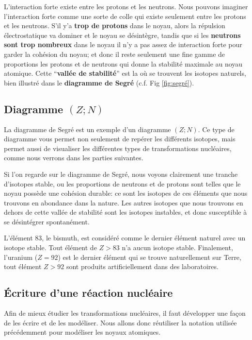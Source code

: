 \documentclass[11pt,a4paper]{article}
\begin{document}
L'interaction forte existe entre les protons et les neutrons. Nous pouvons imaginer l'interaction forte comme une sorte de colle qui existe seulement entre les protons et les neutrons. S'il y'a \textbf{trop de protons} dans le noyau, alors la répulsion électrostatique va dominer et le noyau se désintègre, tandis que si les \textbf{neutrons sont trop nombreux} dans le noyau il n'y a pas assez de interaction forte pour garder la cohésion du noyau; et donc il reste seulement une fine gamme de proportions les protons et de neutrons qui donne la stabilité maximale au noyau atomique. Cette ``\textbf{vallée de stabilité}'' est la où se trouvent les isotopes naturels, bien illustré dans le \textbf{diagramme de Segré} (c.f. Fig \ref{fig:segré}). 

\subsection*{Diagramme $(Z ; N)$}

La diagramme de Segré est un exemple d'un diagramme $(Z;N)$.  Ce type de diagramme vous permet non seulement de repérer les différents isotopes, mais permet aussi de visualiser les différentes types de transformations nucléaires, comme nous verrons dans les parties suivantes. 

Si l'on regarde sur le diagramme de Segré, nous voyons clairement une tranche d'isotopes stable, ou les proportions de neutrons et de protons sont telles que le noyau possède une cohésion durable: ce sont les isotopes de ces éléments que nous trouvons en abondance dans la nature. Les autres isotopes que nous trouvons en dehors de cette vallée de stabilité sont les isotopes instables, et donc susceptible à se désintégrer spontanément. 

L'élément 83, le bismuth, est considéré comme le dernier élément naturel avec un isotope stable. Tout élément de $Z>83$ n'a aucun isotope stable. Finalement, l'uranium ($Z=92$) est le dernier élément qui se trouve naturellement sur Terre, tout élément $Z>92$ sont produits artificiellement dans des laboratoires. 

\subsection{Écriture d'une réaction nucléaire}

Afin de mieux étudier les transformations nucléaires, il faut développer une façon de les écrire et de les modéliser. Nous allons donc réutiliser la notation utilisée précédemment pour modéliser les noyaux atomiques. 
\end{document}
